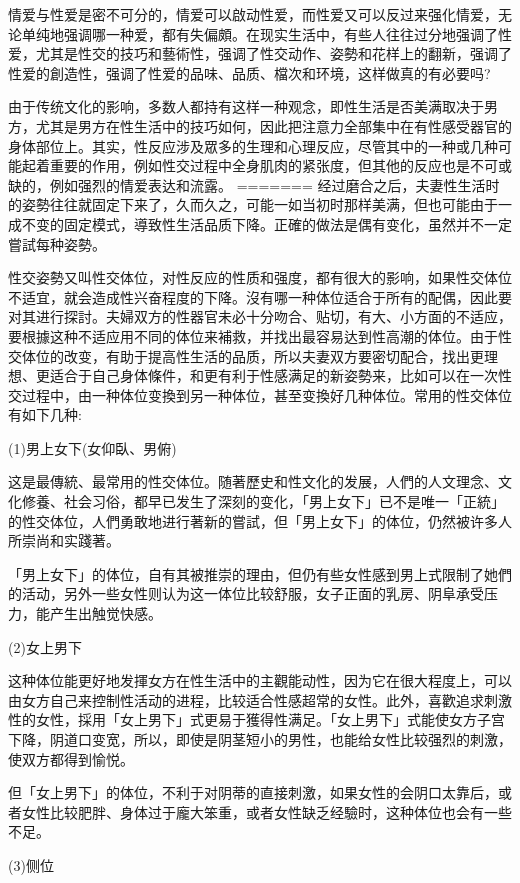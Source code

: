 \documentclass[12pt,UTF8]{ctexbook}
\begin{document}
情爱与性爱是密不可分的，情爱可以啟动性爱，而性爱又可以反过来强化情爱，无论单纯地强调哪一种爱，都有失偏頗。在现实生活中，有些人往往过分地强调了性爱，尤其是性交的技巧和藝術性，强调了性交动作、姿勢和花样上的翻新，强调了性爱的創造性，强调了性爱的品味、品质、檔次和环境，这样做真的有必要吗?

由于传统文化的影响，多数人都持有这样一种观念，即性生活是否美满取决于男方，尤其是男方在性生活中的技巧如何，因此把注意力全部集中在有性感受器官的身体部位上。其实，性反应涉及眾多的生理和心理反应，尽管其中的一种或几种可能起着重要的作用，例如性交过程中全身肌肉的紧张度，但其他的反应也是不可或缺的，例如强烈的情爱表达和流露。
=======
经过磨合之后，夫妻性生活时的姿勢往往就固定下来了，久而久之，可能一如当初时那样美满，但也可能由于一成不变的固定模式，導致性生活品质下降。正確的做法是偶有变化，虽然并不一定嘗試每种姿勢。

性交姿勢又叫性交体位，对性反应的性质和强度，都有很大的影响，如果性交体位不适宜，就会造成性兴奋程度的下降。沒有哪一种体位适合于所有的配偶，因此要对其进行探討。夫婦双方的性器官未必十分吻合、贴切，有大、小方面的不适应，要根據这种不适应用不同的体位来補救，并找出最容易达到性高潮的体位。由于性交体位的改变，有助于提高性生活的品质，所以夫妻双方要密切配合，找出更理想、更适合于自己身体條件，和更有利于性感满足的新姿勢来，比如可以在一次性交过程中，由一种体位变換到另一种体位，甚至变換好几种体位。常用的性交体位有如下几种:

(1)男上女下(女仰臥、男俯)

这是最傳統、最常用的性交体位。随著歷史和性文化的发展，人們的人文理念、文化修養、社会习俗，都早已发生了深刻的变化，「男上女下」已不是唯一「正統」的性交体位，人們勇敢地进行著新的嘗試，但「男上女下」的体位，仍然被许多人所崇尚和实踐著。

「男上女下」的体位，自有其被推崇的理由，但仍有些女性感到男上式限制了她們的活动，另外一些女性则认为这一体位比较舒服，女子正面的乳房、阴阜承受压力，能产生出触觉快感。

(2)女上男下

这种体位能更好地发揮女方在性生活中的主觀能动性，因为它在很大程度上，可以由女方自己来控制性活动的进程，比较适合性感超常的女性。此外，喜歡追求刺激性的女性，採用「女上男下」式更易于獲得性满足。「女上男下」式能使女方子宫下降，阴道口变宽，所以，即使是阴茎短小的男性，也能给女性比较强烈的刺激，使双方都得到愉悦。

但「女上男下」的体位，不利于对阴蒂的直接刺激，如果女性的会阴口太靠后，或者女性比较肥胖、身体过于龐大笨重，或者女性缺乏经驗时，这种体位也会有一些不足。

(3)侧位
\end{document}
